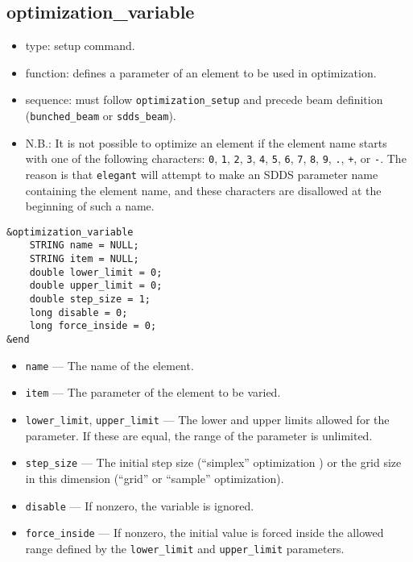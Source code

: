 \documentclass[11pt]{article}
\begin{document}
\subsection{optimization\_variable \label{subsec:optimizationvariable}}

\begin{itemize}
\item type: setup command.
\item function: defines a parameter of an element to be used in optimization.
\item sequence: must follow \verb|optimization_setup| and precede beam definition (\verb|bunched_beam| or \verb|sdds_beam|).
\item N.B.: It is not possible to optimize an element if the element name starts with one of the following
characters: 
\verb|0|, \verb|1|, \verb|2|, \verb|3|, \verb|4|, \verb|5|, \verb|6|, \verb|7|, \verb|8|,
\verb|9|, \verb|.|, \verb|+|, or \verb|-|.  The reason is that {\tt elegant} will attempt to 
make an SDDS parameter name containing the element name, and these characters are disallowed
at the beginning of such a name.
\end{itemize}

\begin{verbatim}
&optimization_variable
    STRING name = NULL;
    STRING item = NULL;
    double lower_limit = 0;
    double upper_limit = 0;
    double step_size = 1;
    long disable = 0;
    long force_inside = 0;
&end
\end{verbatim}

\begin{itemize}
\item \verb|name| --- The name of the element.
\item \verb|item| --- The parameter of the element to be varied.
\item \verb|lower_limit|, \verb|upper_limit| --- The lower and upper limits allowed for the parameter.  If these are
equal, the range of the parameter is unlimited.
\item \verb|step_size| --- The initial step size (``simplex'' optimization ) or the grid size in this dimension (``grid'' or ``sample'' optimization).
\item \verb|disable| --- If nonzero, the variable is ignored.
\item \verb|force_inside| --- If nonzero, the initial value is forced inside the allowed range defined by the \verb|lower_limit| and \verb|upper_limit| parameters.
\end{itemize}
\end{document}
